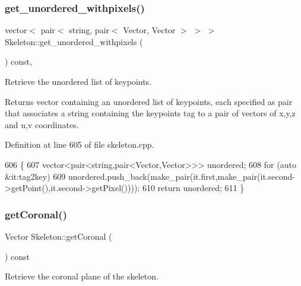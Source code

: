 \subsubsection{\texorpdfstring{get\+\_\+unordered\+\_\+withpixels()}{get\_unordered\_withpixels()}}
{\footnotesize\ttfamily vector$<$ pair$<$ string, pair$<$ Vector, Vector $>$ $>$ $>$ Skeleton\+::get\+\_\+unordered\+\_\+withpixels (\begin{DoxyParamCaption}{ }\end{DoxyParamCaption}) const\hspace{0.3cm}{\ttfamily [virtual]}, {\ttfamily [inherited]}}



Retrieve the unordered list of keypoints. 

\begin{DoxyReturn}{Returns}
vector containing an unordered list of keypoints, each specified as pair that associates a string containing the keypoint\textquotesingle{}s tag to a pair of vectors of x,y,z and u,v coordinates. 
\end{DoxyReturn}


Definition at line 605 of file skeleton.\+cpp.


\begin{DoxyCode}
606 \{
607     vector<pair<string,pair<Vector,Vector>>> unordered;
608     \textcolor{keywordflow}{for} (\textcolor{keyword}{auto} &it:tag2key)
609         unordered.push\_back(make\_pair(it.first,make\_pair(it.second->getPoint(),it.second->getPixel())));
610     \textcolor{keywordflow}{return} unordered;
611 \}
\end{DoxyCode}
\mbox{\label{classassistive__rehab_1_1Skeleton_aa241a0ac93a9ead198f985073c8935eb}} 
\subsubsection{\texorpdfstring{get\+Coronal()}{getCoronal()}}
{\footnotesize\ttfamily Vector Skeleton\+::get\+Coronal (\begin{DoxyParamCaption}{ }\end{DoxyParamCaption}) const\hspace{0.3cm}{\ttfamily [inherited]}}



Retrieve the coronal plane of the skeleton. 

